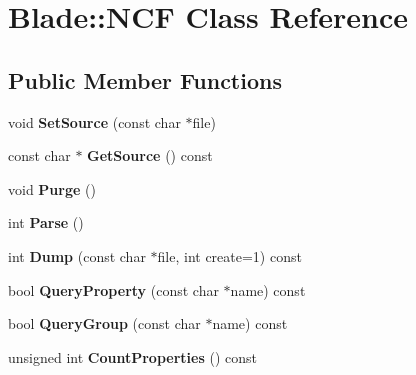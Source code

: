\hypertarget{class_blade_1_1_n_c_f}{}\section{Blade\+:\+:N\+CF Class Reference}
\label{class_blade_1_1_n_c_f}
\subsection*{Public Member Functions}
\begin{DoxyCompactItemize}
\item 
\mbox{\label{class_blade_1_1_n_c_f_aec283741da4292cfb5f8d2d637575621}} 
void {\bfseries Set\+Source} (const char $\ast$file)
\item 
\mbox{\label{class_blade_1_1_n_c_f_a80e322e0d7afa6d5a1b30fa72c6390f5}} 
const char $\ast$ {\bfseries Get\+Source} () const
\item 
\mbox{\label{class_blade_1_1_n_c_f_a8da4da2db1d461a702da7f393549653a}} 
void {\bfseries Purge} ()
\item 
\mbox{\label{class_blade_1_1_n_c_f_a7bb935bc00fbd3148fe2c1a5e4ed6e70}} 
int {\bfseries Parse} ()
\item 
\mbox{\label{class_blade_1_1_n_c_f_a8115afecc76f5c5394c01f9b7f3f3c61}} 
int {\bfseries Dump} (const char $\ast$file, int create=1) const
\item 
\mbox{\label{class_blade_1_1_n_c_f_a6326fa802fc4f1d37a1ff70b20bcb9c2}} 
bool {\bfseries Query\+Property} (const char $\ast$name) const
\item 
\mbox{\label{class_blade_1_1_n_c_f_a5d11ae00c0f180d63f1e9e2f99dddf29}} 
bool {\bfseries Query\+Group} (const char $\ast$name) const
\item 
\mbox{\label{class_blade_1_1_n_c_f_a1beb9b88925a9efed0946a7beaa48285}} 
unsigned int {\bfseries Count\+Properties} () const
\item 
\mbox{\label{class_blade_1_1_n_c_f_afbf5dba9744140317952292c92f99874}} 

\end{DoxyCompactItemize}
